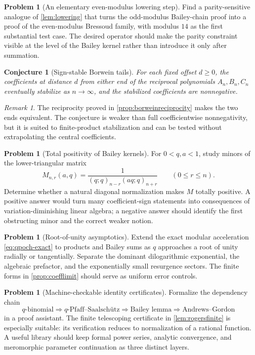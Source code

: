 \documentclass[11pt]{article}
\numberwithin{equation}{section}
\newtheorem{conjecture}[theorem]{Conjecture}
\theoremstyle{definition}
\newtheorem{problem}[theorem]{Problem}
\theoremstyle{remark}
\newtheorem{remark}[theorem]{Remark}
\begin{document}
\begin{problem}[An elementary even-modulus lowering step]\label{prob:evenlower}
Find a parity-sensitive analogue of \cref{lem:lowering} that turns the
odd-modulus Bailey-chain proof into a proof of the even-modulus Bressoud
family, with modulus $14$ as the first substantial test case.  The desired
operator should make the parity constraint visible at the level of the
Bailey kernel rather than introduce it only after summation.
\end{problem}

\begin{conjecture}[Sign-stable Borwein tails]\label{conj:signstable}
For each fixed offset $d\ge0$, the coefficients at distance $d$ from either
end of the reciprocal polynomials $A_n,B_n,C_n$ eventually stabilize as
$n\to\infty$, and the stabilized coefficients are nonnegative.
\end{conjecture}

\begin{remark}
The reciprocity proved in \cref{prop:borweinreciprocity} makes the two ends
equivalent.  The conjecture is weaker than full coefficientwise
nonnegativity, but it is suited to finite-product stabilization and can be
tested without extrapolating the central coefficients.
\end{remark}

\begin{problem}[Total positivity of Bailey kernels]\label{prob:TP}
For $0<q,a<1$, study minors of the lower-triangular matrix
\[
M_{n,r}(a,q)=\frac1{(q;q)_{n-r}(aq;q)_{n+r}}\qquad(0\le r\le n).
\]
Determine whether a natural diagonal normalization makes $M$ totally
positive.  A positive answer would turn many coefficient-sign statements
into consequences of variation-diminishing linear algebra; a negative answer
should identify the first obstructing minor and the correct weaker notion.
\end{problem}

\begin{problem}[Root-of-unity asymptotics]\label{prob:rootsunity}
Extend the exact modular acceleration \eqref{eq:qpoch-exact} to products and
Bailey sums as $q$ approaches a root of unity radially or tangentially.
Separate the dominant dilogarithmic exponential, the algebraic prefactor,
and the exponentially small resurgence sectors.  The finite forms in
\cref{prop:coefflimit} should serve as uniform error controls.
\end{problem}

\begin{problem}[Machine-checkable identity certificates]\label{prob:formal}
Formalize the dependency chain
\[
q\text{-binomial}\Rightarrow q\text{-Pfaff--Saalsch\"utz}
\Rightarrow\text{Bailey lemma}\Rightarrow\text{Andrews--Gordon}
\]
in a proof assistant.  The finite telescoping certificate in
\cref{lem:rogersfinite} is especially suitable: its verification reduces to
normalization of a rational function.  A useful library should keep formal
power series, analytic convergence, and meromorphic parameter continuation as
three distinct layers.
\end{problem}
\end{document}
